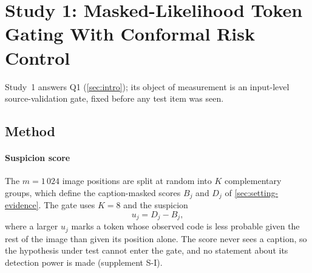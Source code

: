 
\section{Study 1: Masked-Likelihood Token Gating With Conformal Risk Control}\label{sec:study1}
Study~1 answers Q1 (\cref{sec:intro}); its object of measurement is an input-level source-validation gate, fixed before any test item
was seen.

\subsection{Method}\label{sec:study1-method}

\paragraph*{Suspicion score}
The $m=1\,024$ image positions are split at random into $K$ complementary groups, which define the caption-masked scores $B_j$ and
$D_j$ of \cref{sec:setting-evidence}.
The gate uses $K=8$ and the suspicion
\begin{equation}
u_j=D_j-B_j ,
\label{eq:suspicion}
\end{equation}
where a larger $u_j$ marks a token whose observed code is less probable given the rest of the image than given its position alone.
The score never sees a caption, so the hypothesis under test cannot enter the gate, and no statement about its detection power is made
(supplement S-I).

